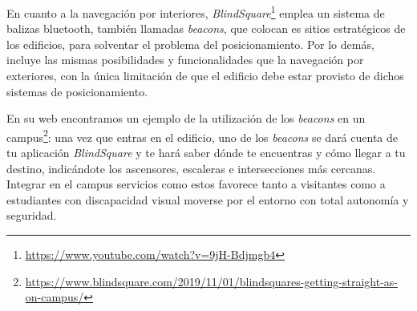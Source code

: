 En cuanto a la navegación por interiores, \textit{BlindSquare}\footnote{\url{https://www.youtube.com/watch?v=9jH-Bdjmgb4}} emplea un sistema de balizas bluetooth, también llamadas \textit{beacons}, que colocan es sitios estratégicos de los edificios, para solventar el problema del posicionamiento. Por lo demás, incluye las mismas posibilidades y funcionalidades que la navegación por exteriores, con la única limitación de que el edificio debe estar provisto de dichos sistemas de posicionamiento.

En su web encontramos un ejemplo de la utilización de los \textit{beacons} en un campus\footnote{\url{https://www.blindsquare.com/2019/11/01/blindsquares-getting-straight-as-on-campus/}}: una vez que entras en el edificio, uno de los \textit{beacons} se dará cuenta de tu aplicación \textit{BlindSquare} y te hará saber dónde te encuentras y cómo llegar a tu destino, indicándote los ascensores, escaleras e intersecciones más cercanas. Integrar en el campus servicios como estos favorece tanto a visitantes como a estudiantes con discapacidad visual moverse por el entorno con total autonomía y seguridad.

